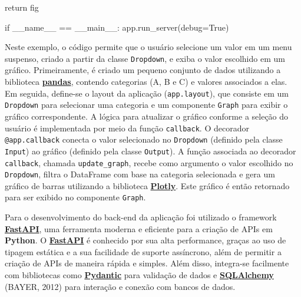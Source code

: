 \documentclass[
  12pt,
  a4paper,
]{scrreprt}
\newenvironment{Shaded}{}{}
\newcommand{\ControlFlowTok}[1]{\textcolor[rgb]{0.84,0.23,0.29}{#1}}
\newcommand{\NormalTok}[1]{\textcolor[rgb]{0.14,0.16,0.18}{#1}}
\newcommand{\OperatorTok}[1]{\textcolor[rgb]{0.14,0.16,0.18}{#1}}
\newcommand{\StringTok}[1]{\textcolor[rgb]{0.01,0.18,0.38}{#1}}
\newcommand{\VariableTok}[1]{\textcolor[rgb]{0.89,0.38,0.04}{#1}}
\begin{document}
\begin{Shaded}
\begin{Highlighting}[]
    \ControlFlowTok{return}\NormalTok{ fig}

\ControlFlowTok{if} \VariableTok{\_\_name\_\_} \OperatorTok{==} \StringTok{\textquotesingle{}\_\_main\_\_\textquotesingle{}}\NormalTok{:}
\NormalTok{    app.run\_server(debug}\OperatorTok{=}\VariableTok{True}\NormalTok{)}
\end{Highlighting}
\end{Shaded}

Neste exemplo, o código permite que o usuário selecione um valor em um
menu suspenso, criado a partir da classe \texttt{Dropdown}, e exiba o
valor escolhido em um gráfico. Primeiramente, é criado um pequeno
conjunto de dados utilizando a biblioteca
\href{https://pandas.pydata.org/}{\textbf{pandas}}, contendo categorias
(A, B e C) e valores associados a elas. Em seguida, define-se o layout
da aplicação (\texttt{app.layout}), que consiste em um \texttt{Dropdown}
para selecionar uma categoria e um componente \texttt{Graph} para exibir
o gráfico correspondente. A lógica para atualizar o gráfico conforme a
seleção do usuário é implementada por meio da função \texttt{callback}.
O decorador \texttt{@app.callback} conecta o valor selecionado no
\texttt{Dropdown} (definido pela classe \texttt{Input}) ao gráfico
(definido pela classe \texttt{Output}). A função associada ao decorador
\texttt{callback}, chamada \texttt{update\_graph}, recebe como argumento
o valor escolhido no \texttt{Dropdown}, filtra o DataFrame com base na
categoria selecionada e gera um gráfico de barras utilizando a
biblioteca \href{https://plotly.com/}{\textbf{Plotly}}. Este gráfico é
então retornado para ser exibido no componente \texttt{Graph}.

\vspace{12pt}

Para o desenvolvimento do back-end da aplicação foi utilizado o
framework \href{https://fastapi.tiangolo.com/}{\textbf{FastAPI}}, uma
ferramenta moderna e eficiente para a criação de APIs em
\textbf{Python}. O
\href{https://fastapi.tiangolo.com/}{\textbf{FastAPI}} é conhecido por
sua alta performance, graças ao uso de tipagem estática e a sua
facilidade de suporte assíncrono, além de permitir a criação de APIs de
maneira rápida e simples. Além disso, integra-se facilmente com
bibliotecas como
\href{https://docs.pydantic.dev/latest/}{\textbf{Pydantic}} para
validação de dados e
\href{https://www.sqlalchemy.org/}{\textbf{SQLAlchemy}} (BAYER, 2012)
para interação e conexão com bancos de dados.

\vspace{12pt}
\end{document}
